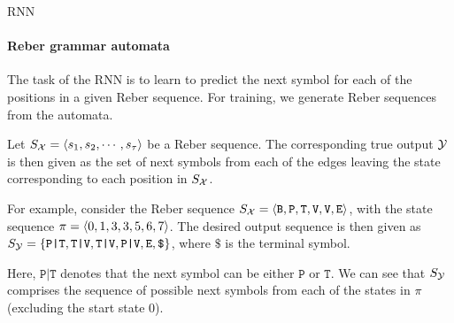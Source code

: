 \begin{frame}{RNN}
\framesubtitle{Reber grammar automata}
    The task of the RNN is to learn to predict the next symbol for each
    of the positions in a given Reber sequence. For training, we
    generate Reber sequences from the automata.

\medskip

    Let $S_{\mathcal X} = \langle s_1, s_2, \cdots, s_{\tau} \rangle$ be a Reber
    sequence. The corresponding true output ${\mathcal Y}$ is then given as the
    set of next symbols from each of the edges leaving the state
    corresponding to each position in $S_{\mathcal X}$. 

\medskip

For example, consider the
    Reber sequence $S_{\mathcal X} = \langle \texttt{B}, \texttt{P}, \texttt{T},
    \texttt{V}, \texttt{V}, \texttt{E} \rangle$, with the state sequence $\pi =
    \langle 0,1,3,3,5,6,7 \rangle$. The desired output sequence is then given as
    $S_{\mathcal Y} = \{\texttt{P|T}, \texttt{T|V}, \texttt{T|V}, \texttt{P|V},
    \texttt{E}, \texttt{\$} \}$, where $\texttt{\$}$ is the terminal
    symbol. 


\medskip

    Here, $\texttt{P|T}$ denotes that the next symbol can be either
    $\texttt{P}$ or $\texttt{T}$.
    We can see that $S_{\mathcal Y}$ comprises the sequence of possible
    next symbols from each of the states in $\pi$ (excluding the start
    state $0$).
\end{frame}

